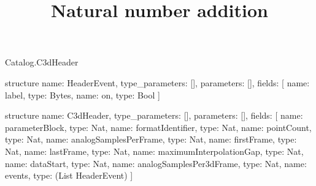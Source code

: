 \begin{lexlean}{Catalog.C3dHeader}
\title{Natural number addition}
\begin{semanticmodule}
structure{
  name: HeaderEvent,
  type_parameters: [],
  parameters: [],
  fields: [
    {name: label, type: Bytes},
    {name: on, type: Bool}
  ]
}

structure{
  name: C3dHeader,
  type_parameters: [],
  parameters: [],
  fields: [
    {name: parameterBlock, type: Nat},
    {name: formatIdentifier, type: Nat},
    {name: pointCount, type: Nat},
    {name: analogSamplesPerFrame, type: Nat},
    {name: firstFrame, type: Nat},
    {name: lastFrame, type: Nat},
    {name: maximumInterpolationGap, type: Nat},
    {name: dataStart, type: Nat},
    {name: analogSamplesPer3dFrame, type: Nat},
    {name: events, type: (List HeaderEvent)}
  ]
}
\end{semanticmodule}
\end{lexlean}
